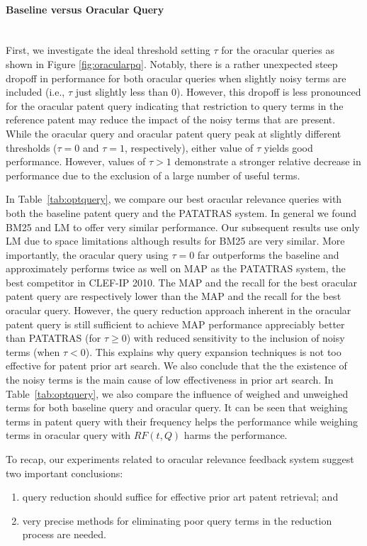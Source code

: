 \paragraph{Baseline versus Oracular Query}
\ \\
First, we investigate the ideal threshold setting $\tau$ for the
oracular queries as shown in Figure \ref{fig:oracularpq}.  Notably,
there is a rather unexpected steep dropoff in performance for both
oracular queries when slightly noisy terms are included
(i.e., $\tau$ just slightly less than 0).  However, this dropoff is
less pronounced for the
oracular patent query indicating that restriction to query terms in the
reference patent may reduce the impact of the noisy terms that are present.
While the oracular query and oracular patent query peak
at slightly different thresholds ($\tau = 0$ and $\tau = 1$, respectively), 
either value of $\tau$ yields good performance.
However, values of $\tau > 1$
demonstrate a stronger relative decrease in performance due to the exclusion 
of a large number of useful terms.

In Table~\ref{tab:optquery}, we compare our best oracular relevance
queries with both the baseline patent query and the PATATRAS
system.  In general we found BM25 and LM to offer very similar
performance.  Our subsequent results use only LM due to space
limitations although results for BM25 are very similar.  More
importantly, the oracular query using $\tau=0$ far
outperforms the baseline and approximately performs twice as well on
MAP as the PATATRAS system, the best competitor in CLEF-IP 2010.  The
MAP and the recall for the best oracular patent query are
respectively lower than the MAP and the recall for the
best oracular query.  However, the query reduction approach
inherent in the oracular patent query is still sufficient to
achieve MAP performance appreciably better than PATATRAS (for
$\tau \geq 0$) with reduced sensitivity to the inclusion of noisy
terms (when $\tau < 0$). 
This explains why query expansion techniques is not too effective for patent prior art search. We also conclude that the the existence of the noisy terms is the main cause of low effectiveness in prior art search. In Table~\ref{tab:optquery}, we also compare the influence of weighed and unweighed terms for both baseline query and oracular query. It can be seen that weighing terms in patent query with their frequency helps the performance while weighing terms in oracular query with $RF(t, Q)$ harms the performance.  

To recap, our experiments related to oracular relevance feedback system
suggest two important conclusions: 
\begin{enumerate}
\item query reduction should suffice for effective prior art patent retrieval; and  
\item very precise methods for eliminating poor query terms in the reduction process are needed.
\end{enumerate}



